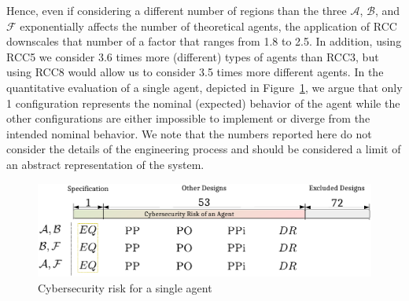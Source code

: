 \documentclass[conference]{IEEEtran}
\newcommand{\assertionRegion}{\mathcal{A}}
\newcommand{\beliefRegion}{\mathcal{B}}
\newcommand{\factRegion}{\mathcal{F}}
\begin{document}
Hence, even if considering a different number of regions than the three
$\assertionRegion$, $\beliefRegion$, and $\factRegion$ exponentially affects
the number of theoretical agents, the application of RCC downscales that number
of a factor that ranges from 1.8 to 2.5. In addition, using RCC5 we consider
3.6 times more (different) types of agents than RCC3, but using RCC8 would
allow us to consider 3.5 times more different agents.
In the quantitative evaluation of a single agent, depicted in Figure~\ref{fig:quantitative},
we argue that only 1 configuration represents the nominal (expected) behavior 
of the agent while the other configurations are either impossible to 
implement or diverge from the intended nominal behavior. We note 
that the numbers reported here do not consider the details of the
engineering process and should be considered a limit of an abstract 
representation of the system.
\begin{figure}[t]
	\centering
	\includegraphics[width=\columnwidth]{quantitative.pdf}
	\caption{Cybersecurity risk for a single agent}
	\label{fig:quantitative}
\end{figure}
\end{document}
